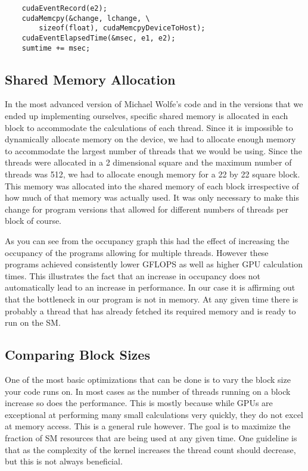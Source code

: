 \documentclass[10pt]{article}
\begin{document}
\begin{multicols}{2}
\begin{enumerate}
    \begin{verbatim}
    cudaEventRecord(e2);
    cudaMemcpy(&change, lchange, \
        sizeof(float), cudaMemcpyDeviceToHost);
    cudaEventElapsedTime(&msec, e1, e2);
    sumtime += msec;
    \end{verbatim}

    \end{enumerate}

    \subsection{Shared Memory Allocation}%
    In the most advanced version of Michael Wolfe's code and in the versions that we ended up implementing ourselves, specific shared memory is allocated in each block to accommodate the calculations of each thread.
    Since it is impossible to dynamically allocate memory on the device, we had to allocate enough memory to accommodate the largest number of threads that we would be using.
    Since the threads were allocated in a 2 dimensional square and the maximum number of threads was 512, we had to allocate enough memory for a 22 by 22 square block.
    This memory was allocated into the shared memory of each block irrespective of how much of that memory was actually used.
    It was only necessary to make this change for program versions that allowed for different numbers of threads per block of course.

    As you can see from the occupancy graph this had the effect of increasing the occupancy of the programs allowing for multiple threads.
    However these programs achieved consistently lower GFLOPS as well as higher GPU calculation times.
    This illustrates the fact that an increase in occupancy does not automatically lead to an increase in performance.
    In our case it is affirming out that the bottleneck in our program is not in memory.
    At any given time there is probably a thread that has already fetched its required memory and is ready to run on the SM.

    \subsection{Comparing Block Sizes}
    One of the most basic optimizations that can be done is to vary the block size your code runs on.
    In most cases as the number of threads running on a block increase so does the performance.
    This is mostly because while GPUs are exceptional at performing many small calculations very quickly, they do not excel at memory access.
    This is a general rule however.
    The goal is to maximize the fraction of SM resources that are being used at any given time.
    One guideline is that as the complexity of the kernel increases the thread count should decrease, but this is not always beneficial.


\end{multicols}
\end{document}
